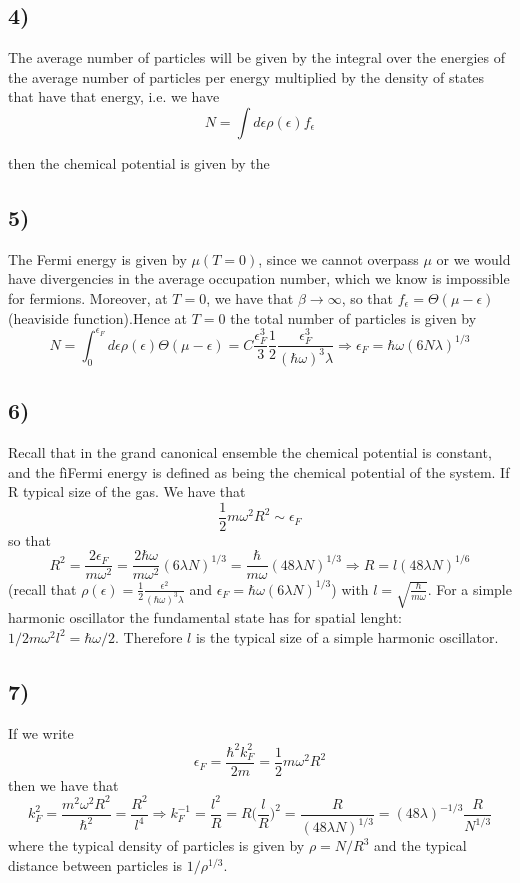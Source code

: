 \documentclass[10pt,a4paper]{book}
\begin{document}
\subsection*{4)}
The average number of particles will be given by the integral over the energies of the average number of particles per energy multiplied by the density of states that have that energy, i.e. we have 
$$N=\int d\epsilon\rho(\epsilon) f_{\epsilon}$$

then the chemical potential is given by the 

\subsection*{5)}
The Fermi energy is given by $\mu(T=0)$, since we cannot overpass $\mu$ or we would have divergencies in the average occupation number, which we know is impossible for fermions. Moreover, at $T=0$, we have that $\beta\to\infty$, so that $f_{\epsilon}=\Theta(\mu-\epsilon)$ (heaviside function).Hence at $T=0$ the total number of particles is given by 
$$N=\int_0^{\epsilon_F}d\epsilon\rho(\epsilon)\Theta(\mu-\epsilon) =C\frac{\epsilon_F^3}{3}\frac{1}{2}\frac{\epsilon_F^3}{(\hbar\omega)^3\lambda}\Rightarrow \epsilon_F=\hbar\omega(6N\lambda)^{1/3}$$

\subsection*{6)}
Recall that in the grand canonical ensemble the chemical potential is constant, and the fìFermi energy is defined as being the chemical potential of the system. If R typical size of the gas. We have that
$$\frac{1}{2}m\omega^2R^2\sim\epsilon_F$$ so that
$$R^2=\frac{2\epsilon_F}{m\omega^2}=\frac{2\hbar\omega}{m\omega^2}(6\lambda N)^{1/3}=\frac{\hbar}{m\omega}(48\lambda N)^{1/3}\Rightarrow R=l(48\lambda N)^{1/6}$$ (recall that $\rho(\epsilon)=\frac{1}{2}\frac{\epsilon^2}{(\hbar\omega)^3\lambda}$ and $\epsilon_F=\hbar\omega(6\lambda N)^{1/3}$) with $l=\sqrt{\frac{\hbar}{m\omega}}$. For a simple harmonic oscillator the fundamental state has for spatial lenght: $1/2 m\omega^2 l^2=\hbar\omega/2$. Therefore $l$ is the typical size of a simple harmonic oscillator.

\subsection*{7)}
If we write $$\epsilon_F=\frac{\hbar^2k_F^2}{2m}=\frac{1}{2}m\omega^2 R^2$$ then we have that
$$k_F^2=\frac{m^2\omega^2 R^2}{\hbar^2}=\frac{R^2}{l^4}\Rightarrow k_F^{-1}=\frac{l^2}{R}=R\bigg(\frac{l}{R}\bigg)^2=\frac{R}{(48\lambda N)^{1/3}}={(48\lambda)^{-1/3}}\frac{R}{N^{1/3}}$$
 where the typical density of particles is given by $\rho=N/R^3$ and the typical distance between particles is $1/\rho^{1/3}$.
\end{document}
